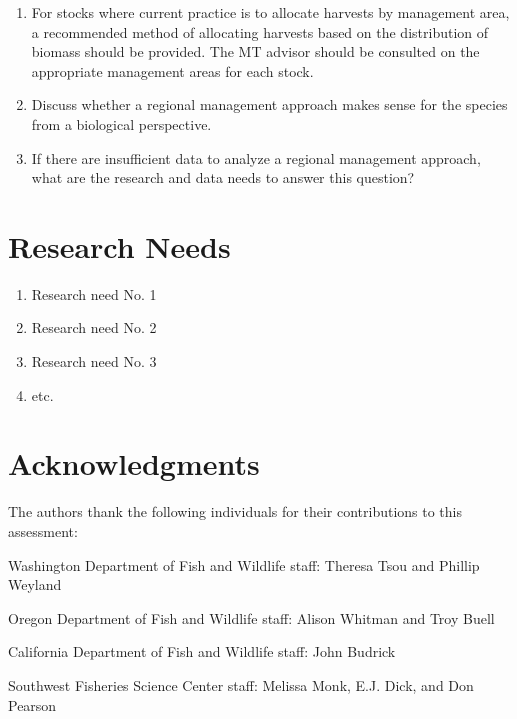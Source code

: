 \documentclass[12pt,]{article}
\providecommand{\tightlist}{%
  \setlength{\itemsep}{0pt}\setlength{\parskip}{0pt}}
\begin{document}
\begin{enumerate}
\def\labelenumi{\arabic{enumi}.}
\tightlist
\item
  For stocks where current practice is to allocate harvests by
  management area, a recommended method of allocating harvests based on
  the distribution of biomass should be provided. The MT advisor should
  be consulted on the appropriate management areas for each stock.
\item
  Discuss whether a regional management approach makes sense for the
  species from a biological perspective.
\item
  If there are insufficient data to analyze a regional management
  approach, what are the research and data needs to answer this
  question?
\end{enumerate}

\newpage

\section{Research Needs}\label{research-needs}

\begin{enumerate}

\item Research need No. 1

\item Research need No. 2

\item Research need No. 3

\item etc.

\end{enumerate}

\newpage

\section{Acknowledgments}\label{acknowledgments}

The authors thank the following individuals for their contributions to
this assessment:

Washington Department of Fish and Wildlife staff: Theresa Tsou and
Phillip Weyland

Oregon Department of Fish and Wildlife staff: Alison Whitman and Troy
Buell

California Department of Fish and Wildlife staff: John Budrick

Southwest Fisheries Science Center staff: Melissa Monk, E.J. Dick, and
Don Pearson
\end{document}
